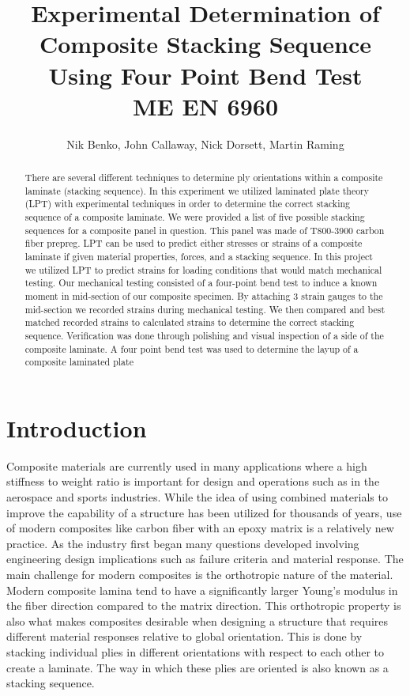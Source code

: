 \documentclass[12pt]{article}
\begin{document}
\title{ Experimental Determination of Composite Stacking Sequence Using Four Point Bend Test\\ \normalsize{ME EN 6960}}
\author{Nik Benko, John Callaway, Nick Dorsett, Martin Raming}
\maketitle
\begin{abstract} %
	There are several different techniques to determine ply orientations within a composite laminate (stacking sequence). In this experiment we utilized laminated plate theory (LPT) with experimental techniques in order to determine the correct stacking sequence of a composite laminate.   We were provided a list of five possible stacking sequences for a composite panel in question. This panel was made of T800-3900 carbon fiber prepreg. LPT can be used to predict either stresses or strains of a composite laminate if given material properties, forces, and a stacking sequence. In this project we utilized LPT to predict strains for loading conditions that would match mechanical testing.  Our mechanical testing consisted of a four-point bend test to induce a known moment in mid-section of our composite specimen. By attaching 3 strain gauges to the mid-section we recorded strains during mechanical testing. We then compared and best matched recorded strains to calculated strains to determine the correct stacking sequence. Verification was done through polishing and visual inspection of a side of the composite laminate.  A four point bend test was used to determine the layup of a composite laminated plate
\end{abstract}

\section{Introduction} %
Composite materials are currently used in many applications where  a high stiffness to weight ratio is important for design and operations such as in the aerospace and sports industries.  While the idea of using combined materials to improve the capability of a structure has been utilized for thousands of years, use of modern composites like carbon fiber with an epoxy matrix is a relatively new practice.  As the industry first began many questions developed involving  engineering design implications such as failure criteria and material response. The main challenge for modern composites is the orthotropic nature of the material. Modern composite lamina tend to have a significantly larger Young's modulus in the fiber direction compared to the matrix direction.  This orthotropic property is also what makes composites desirable when designing a structure that requires different material responses relative to global orientation. This is done by stacking individual plies in different orientations with respect to each other to create a laminate. The way in which these plies are oriented is also known as a  stacking sequence.
\end{document}
